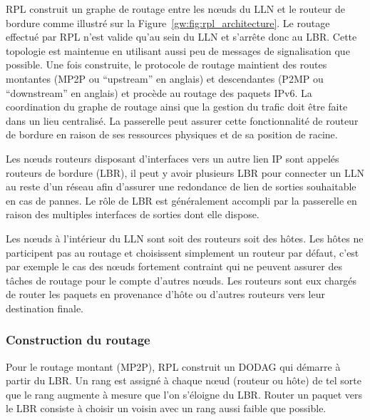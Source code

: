 \ac{RPL} construit un graphe de routage entre les nœuds du \ac{LLN} et le routeur de bordure comme illustré sur la Figure~\ref{gw:fig:rpl_architecture}.
Le routage effectué par \ac{RPL} n'est valide qu'au sein du \ac{LLN} et s'arrête donc au \ac{LBR}.
Cette topologie est maintenue en utilisant aussi peu de messages de signalisation que possible.
Une fois construite, le protocole de routage maintient des routes montantes (\ac{MP2P} ou ``upstream'' en anglais) et descendantes (\ac{P2MP} ou ``downstream'' en anglais) et procède au routage des paquets IPv6.
La coordination du graphe de routage ainsi que la gestion du trafic doit être faite dans un lieu centralisé.
La passerelle peut assurer cette fonctionnalité de routeur de bordure en raison de ses ressources physiques et de sa position de racine.



Les nœuds routeurs disposant d'interfaces vers un autre lien IP sont appelés routeurs de bordure (\ac{LBR}), il peut y avoir plusieurs \ac{LBR} pour connecter un \ac{LLN} au reste d'un réseau afin d'assurer une redondance de lien de sorties souhaitable en cas de pannes.
Le rôle de \ac{LBR} est généralement accompli par la passerelle en raison des multiples interfaces de sorties dont elle dispose.

Les nœuds à l'intérieur du \ac{LLN} sont soit des routeurs soit des hôtes.
Les hôtes ne participent pas au routage et choisissent simplement un routeur par défaut, c'est par exemple le cas des nœuds fortement contraint qui ne peuvent assurer des tâches de routage pour le compte d'autres nœuds.
Les routeurs sont eux chargés de router les paquets en provenance d'hôte ou d'autres routeurs vers leur destination finale.

\subsubsection{Construction du routage}

Pour le routage montant (\ac{MP2P}), \ac{RPL} construit un \ac{DODAG} qui démarre à partir du \ac{LBR}.
Un rang est assigné à chaque nœud (routeur ou hôte) de tel sorte que le rang augmente à mesure que l'on s'éloigne du \ac{LBR}.
Router un paquet vers le \ac{LBR} consiste à choisir un voisin avec un rang aussi faible que possible.

